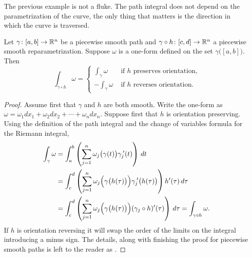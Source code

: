 The previous example is not a fluke.
The path integral does not depend on the parametrization of
the curve, the only thing that matters is the direction in which the curve
is traversed.

\begin{prop} \label{mv:prop:pathintrepararam}
Let $\gamma \colon [a,b] \to {\mathbb{R}}^n$ be a piecewise smooth path and
$\gamma \circ h \colon [c,d] \to {\mathbb{R}}^n$ a piecewise smooth reparametrization.
Suppose $\omega$ is a one-form defined on the set $\gamma\bigl([a,b]\bigr)$.  Then
\begin{equation*}
\int_{\gamma \circ h} \omega =
\begin{cases}
\int_{\gamma} \omega & \text{ if $h$ preserves orientation,}\\
-\int_{\gamma} \omega & \text{ if $h$ reverses orientation.}
\end{cases}
\end{equation*}
\end{prop}

\begin{proof}
Assume first that $\gamma$ and $h$ are both smooth.
Write the one-form  as $\omega = \omega_1 dx_1 + \omega_2 dx_2 + \cdots +
\omega_n dx_n$.
Suppose first that $h$ is orientation preserving.  Using
the definition of the path integral and the change of variables
formula for the Riemann integral,
\begin{equation*}
\begin{split}
\int_{\gamma} \omega
& =
\int_a^b 
\left(
\sum_{j=1}^n
\omega_j\bigl(\gamma(t)\bigr) \gamma_j^{\:\prime}(t)
\right) \, dt
\\
& =
\int_c^d 
\left(
\sum_{j=1}^n
\omega_j\Bigl(\gamma\bigl(h(\tau)\bigr)\Bigr) \gamma_j^{\:\prime}\bigl(h(\tau)\bigr)
\right) h'(\tau) \, d\tau
\\
& =
\int_c^d 
\left(
\sum_{j=1}^n
\omega_j\Bigl(\gamma\bigl(h(\tau)\bigr)\Bigr) (\gamma_j \circ h)'(\tau)
\right) \, d\tau
=
\int_{\gamma \circ h} \omega .
\end{split}
\end{equation*}
If $h$ is orientation reversing it will swap the order of the limits on the
integral introducing a minus sign.  The details, along with finishing the proof for piecewise smooth
paths is left to the reader as .
\end{proof}

